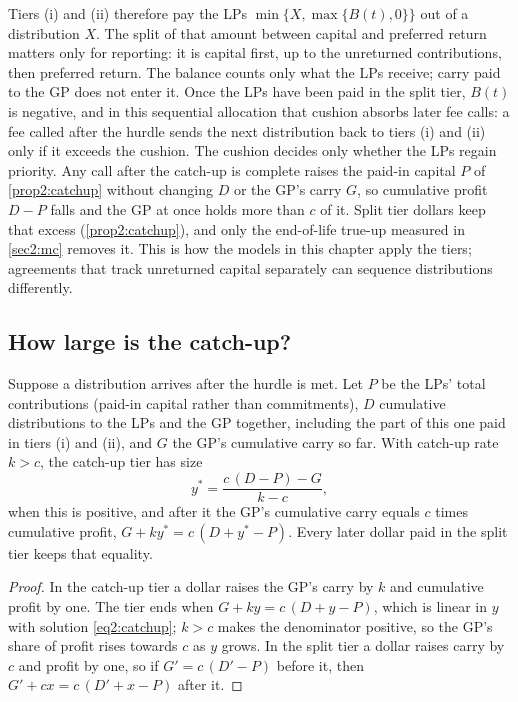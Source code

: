 \begin{chapterrefs}
Tiers (i) and (ii) therefore pay the LPs $\min\{X,\max\{B(t),0\}\}$ out of a distribution $X$. The split
of that amount between capital and preferred return matters only for reporting: it is capital first,
up to the unreturned contributions, then preferred return. The balance counts only what the LPs receive; carry paid to the GP does not enter it. Once the LPs have been paid in the split tier, $B(t)$ is negative,
and in this sequential allocation that cushion absorbs later fee calls: a fee called after the hurdle
sends the next distribution back to tiers (i) and (ii) only if it exceeds the cushion. The cushion
decides only whether the LPs regain priority. Any call after the catch-up is complete raises the
paid-in capital $P$ of \cref{prop2:catchup} without changing $D$ or the GP's carry $G$, so cumulative
profit $D-P$ falls and the GP at once holds more than $c$ of it. Split tier dollars keep that excess
(\cref{prop2:catchup}), and only the end-of-life true-up measured in \cref{sec2:mc} removes it. This is how the models in this chapter apply the
tiers; agreements that track unreturned capital separately can sequence distributions differently.

\subsection{How large is the catch-up?}

\begin{proposition}\label{prop2:catchup}
Suppose a distribution arrives after the hurdle is met. Let $P$ be the LPs' total contributions
(paid-in capital rather than commitments), $D$ cumulative distributions to the LPs and the GP together,
including the part of this one paid in tiers (i) and (ii), and $G$ the GP's cumulative
carry so far. With catch-up rate $k > c$, the catch-up tier has size
\begin{equation}\label{eq2:catchup}
  y^{*} = \frac{c\,(D-P) - G}{k-c},
\end{equation}
when this is positive, and after it the GP's cumulative carry equals $c$ times cumulative profit,
$G + k y^{*} = c\,(D + y^{*} - P)$. Every later dollar paid in the split tier keeps that equality.
\end{proposition}
\begin{proof}
In the catch-up tier a dollar raises the GP's carry by $k$ and cumulative profit by one. The tier ends
when $G + k y = c\,(D + y - P)$, which is linear in $y$ with solution \cref{eq2:catchup}; $k > c$ makes
the denominator positive, so the GP's share of profit rises towards $c$ as $y$ grows. In the split tier
a dollar raises carry by $c$ and profit by one, so if $G' = c\,(D'-P)$ before it, then
$G' + c x = c\,(D' + x - P)$ after it.
\end{proof}


\end{chapterrefs}
